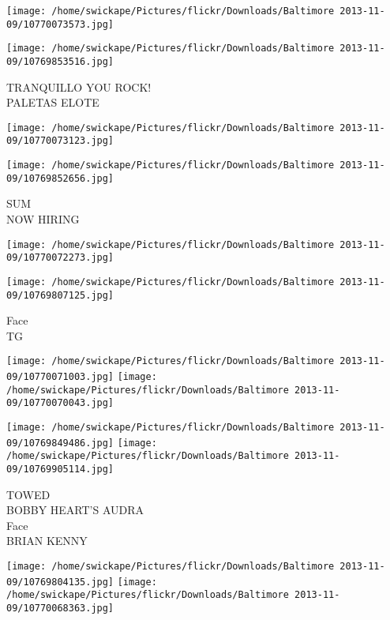 \documentclass[10pt,letterpaper]{article}
\begin{document}
\texttt{[image: /home/swickape/Pictures/flickr/Downloads/Baltimore 2013-11-09/10770073573.jpg]}

\vspace{0.25in}
\texttt{[image: /home/swickape/Pictures/flickr/Downloads/Baltimore 2013-11-09/10769853516.jpg]}

TRANQUILLO YOU ROCK!\\
PALETAS ELOTE\\
\pagebreak

\texttt{[image: /home/swickape/Pictures/flickr/Downloads/Baltimore 2013-11-09/10770073123.jpg]}

\vspace{0.25in}
\texttt{[image: /home/swickape/Pictures/flickr/Downloads/Baltimore 2013-11-09/10769852656.jpg]}

SUM\\
NOW HIRING\\
\pagebreak

\texttt{[image: /home/swickape/Pictures/flickr/Downloads/Baltimore 2013-11-09/10770072273.jpg]}

\vspace{0.25in}
\texttt{[image: /home/swickape/Pictures/flickr/Downloads/Baltimore 2013-11-09/10769807125.jpg]}

Face\\
TG\\
\pagebreak

\texttt{[image: /home/swickape/Pictures/flickr/Downloads/Baltimore 2013-11-09/10770071003.jpg]}
\texttt{[image: /home/swickape/Pictures/flickr/Downloads/Baltimore 2013-11-09/10770070043.jpg]}

\texttt{[image: /home/swickape/Pictures/flickr/Downloads/Baltimore 2013-11-09/10769849486.jpg]}
\texttt{[image: /home/swickape/Pictures/flickr/Downloads/Baltimore 2013-11-09/10769905114.jpg]}

TOWED\\
BOBBY HEART'S AUDRA\\
Face\\
BRIAN KENNY\\
\pagebreak

\texttt{[image: /home/swickape/Pictures/flickr/Downloads/Baltimore 2013-11-09/10769804135.jpg]}
\texttt{[image: /home/swickape/Pictures/flickr/Downloads/Baltimore 2013-11-09/10770068363.jpg]}
\end{document}
